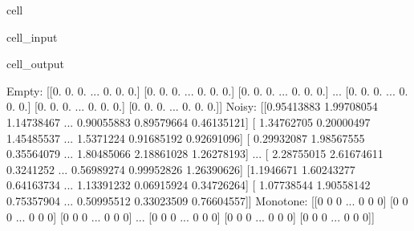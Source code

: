 \documentclass[letterpaper,10pt,english]{jupyterBook}
\begin{document}
\begin{sphinxuseclass}{cell}\begin{sphinxVerbatimInput}

\begin{sphinxuseclass}{cell_input}
\begin{sphinxVerbatim}[commandchars=\\\{\}]
\end{sphinxVerbatim}

\end{sphinxuseclass}\end{sphinxVerbatimInput}
\begin{sphinxVerbatimOutput}

\begin{sphinxuseclass}{cell_output}
\begin{sphinxVerbatim}[commandchars=\\\{\}]
Empty:
 [[0. 0. 0. ... 0. 0. 0.]
 [0. 0. 0. ... 0. 0. 0.]
 [0. 0. 0. ... 0. 0. 0.]
 ...
 [0. 0. 0. ... 0. 0. 0.]
 [0. 0. 0. ... 0. 0. 0.]
 [0. 0. 0. ... 0. 0. 0.]]
Noisy:
 [[\PYGZhy{}0.95413883  1.99708054  1.14738467 ...  0.90055883  0.89579664
   0.46135121]
 [ 1.34762705  0.20000497 \PYGZhy{}1.45485537 ... \PYGZhy{}1.5371224   0.91685192
  \PYGZhy{}0.92691096]
 [ 0.29932087 \PYGZhy{}1.98567555 \PYGZhy{}0.35564079 ... \PYGZhy{}1.80485066  2.18861028
  \PYGZhy{}1.26278193]
 ...
 [ 2.28755015 \PYGZhy{}2.61674611  0.3241252  ... \PYGZhy{}0.56989274 \PYGZhy{}0.99952826
   1.26390626]
 [\PYGZhy{}1.1946671   1.60243277  0.64163734 ...  1.13391232  0.06915924
   0.34726264]
 [ 1.07738544 \PYGZhy{}1.90558142  0.75357904 ...  0.50995512 \PYGZhy{}0.33023509
  \PYGZhy{}0.76604557]]
Monotone:
 [[0 0 0 ... 0 0 0]
 [0 0 0 ... 0 0 0]
 [0 0 0 ... 0 0 0]
 ...
 [0 0 0 ... 0 0 0]
 [0 0 0 ... 0 0 0]
 [0 0 0 ... 0 0 0]]
\end{sphinxVerbatim}

\end{sphinxuseclass}\end{sphinxVerbatimOutput}

\end{sphinxuseclass}
\sphinxstepscope
\end{document}
